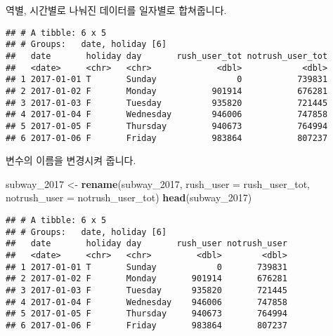 \documentclass[]{article}
\newenvironment{Shaded}{\begin{snugshade}}{\end{snugshade}}
\newcommand{\KeywordTok}[1]{\textcolor[rgb]{0.13,0.29,0.53}{\textbf{#1}}}
\newcommand{\DataTypeTok}[1]{\textcolor[rgb]{0.13,0.29,0.53}{#1}}
\newcommand{\DecValTok}[1]{\textcolor[rgb]{0.00,0.00,0.81}{#1}}
\newcommand{\StringTok}[1]{\textcolor[rgb]{0.31,0.60,0.02}{#1}}
\newcommand{\OperatorTok}[1]{\textcolor[rgb]{0.81,0.36,0.00}{\textbf{#1}}}
\newcommand{\NormalTok}[1]{#1}
\begin{document}
역별, 시간별로 나눠진 데이터를 일자별로 합쳐줍니다.

\begin{Shaded}
\end{Shaded}

\begin{verbatim}
## # A tibble: 6 x 5
## # Groups:   date, holiday [6]
##   date       holiday day       rush_user_tot notrush_user_tot
##   <date>     <chr>   <chr>             <dbl>            <dbl>
## 1 2017-01-01 T       Sunday                0           739831
## 2 2017-01-02 F       Monday           901914           676281
## 3 2017-01-03 F       Tuesday          935820           721445
## 4 2017-01-04 F       Wednesday        946006           747858
## 5 2017-01-05 F       Thursday         940673           764994
## 6 2017-01-06 F       Friday           983864           807237
\end{verbatim}

변수의 이름을 변경시켜 줍니다.

\begin{Shaded}
\begin{Highlighting}[]
\NormalTok{subway_}\DecValTok{2017}\NormalTok{ <-}\StringTok{ }\KeywordTok{rename}\NormalTok{(subway_}\DecValTok{2017}\NormalTok{,}
                      \DataTypeTok{rush_user =}\NormalTok{ rush_user_tot,}
                      \DataTypeTok{notrush_user =}\NormalTok{ notrush_user_tot)}
\KeywordTok{head}\NormalTok{(subway_}\DecValTok{2017}\NormalTok{)}
\end{Highlighting}
\end{Shaded}

\begin{verbatim}
## # A tibble: 6 x 5
## # Groups:   date, holiday [6]
##   date       holiday day       rush_user notrush_user
##   <date>     <chr>   <chr>         <dbl>        <dbl>
## 1 2017-01-01 T       Sunday            0       739831
## 2 2017-01-02 F       Monday       901914       676281
## 3 2017-01-03 F       Tuesday      935820       721445
## 4 2017-01-04 F       Wednesday    946006       747858
## 5 2017-01-05 F       Thursday     940673       764994
## 6 2017-01-06 F       Friday       983864       807237
\end{verbatim}
\end{document}
